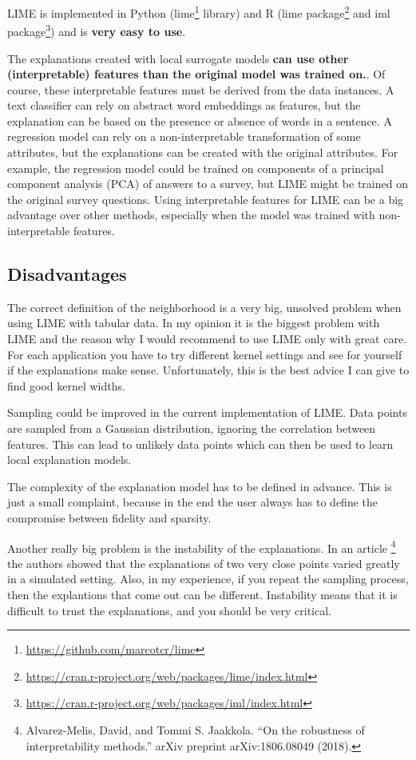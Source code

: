 \documentclass[
  12pt,
]{krantz}
\renewcommand{\href}[2]{#2\footnote{\url{#1}}}
\begin{document}
LIME is implemented in Python (\href{https://github.com/marcotcr/lime}{lime} library) and R (\href{https://cran.r-project.org/web/packages/lime/index.html}{lime package} and \href{https://cran.r-project.org/web/packages/iml/index.html}{iml package}) and is \textbf{very easy to use}.

The explanations created with local surrogate models \textbf{can use other (interpretable) features than the original model was trained on.}.
Of course, these interpretable features must be derived from the data instances.
A text classifier can rely on abstract word embeddings as features, but the explanation can be based on the presence or absence of words in a sentence.
A regression model can rely on a non-interpretable transformation of some attributes, but the explanations can be created with the original attributes.
For example, the regression model could be trained on components of a principal component analysis (PCA) of answers to a survey, but LIME might be trained on the original survey questions.
Using interpretable features for LIME can be a big advantage over other methods, especially when the model was trained with non-interpretable features.

\hypertarget{disadvantages-13}{%
\subsection{Disadvantages}\label{disadvantages-13}}

The correct definition of the neighborhood is a very big, unsolved problem when using LIME with tabular data.
In my opinion it is the biggest problem with LIME and the reason why I would recommend to use LIME only with great care.
For each application you have to try different kernel settings and see for yourself if the explanations make sense.
Unfortunately, this is the best advice I can give to find good kernel widths.

Sampling could be improved in the current implementation of LIME.
Data points are sampled from a Gaussian distribution, ignoring the correlation between features.
This can lead to unlikely data points which can then be used to learn local explanation models.

The complexity of the explanation model has to be defined in advance.
This is just a small complaint, because in the end the user always has to define the compromise between fidelity and sparsity.

Another really big problem is the instability of the explanations.
In an article \footnote{Alvarez-Melis, David, and Tommi S. Jaakkola. ``On the robustness of interpretability methods.'' arXiv preprint arXiv:1806.08049 (2018).} the authors showed that the explanations of two very close points varied greatly in a simulated setting.
Also, in my experience, if you repeat the sampling process, then the explantions that come out can be different.
Instability means that it is difficult to trust the explanations, and you should be very critical.
\end{document}
